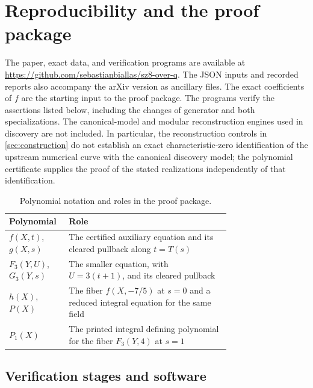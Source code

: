 \section{Reproducibility and the proof package}\label{sec:computation}

The paper, exact data, and verification programs are available at
\url{https://github.com/sebastianbiallas/sz8-over-q}.
The JSON inputs and recorded reports also accompany the arXiv version as
ancillary files.
The exact coefficients of $f$ are the starting input to the proof package.
The programs verify the assertions listed below, including the changes of
generator and both specializations. The canonical-model and modular
reconstruction engines used in discovery are not included. In particular,
the reconstruction controls in \cref{sec:construction} do not establish an
exact characteristic-zero identification of the upstream numerical curve
with the canonical discovery model; the polynomial certificate supplies
the proof of the stated realizations independently of that identification.

\begin{table}[ht]
\centering\small
\begin{tabular}{@{}lp{0.73\linewidth}@{}}
\toprule
Polynomial&Role\\
\midrule
$f(X,t)$, $g(X,s)$&The certified auxiliary equation and its cleared pullback along $t=T(s)$\\
$F_3(Y,U)$, $G_3(Y,s)$&The smaller equation, with $U=3(t+1)$, and its cleared pullback\\
$h(X)$, $P(X)$&The fiber $f(X,-7/5)$ at $s=0$ and a reduced integral equation for the same field\\
$P_1(X)$&The printed integral defining polynomial for the fiber $F_3(Y,4)$ at $s=1$\\
\bottomrule
\end{tabular}
\caption{Polynomial notation and roles in the proof package.}
\label{tab:presentations}
\end{table}

\subsection{Verification stages and software}

